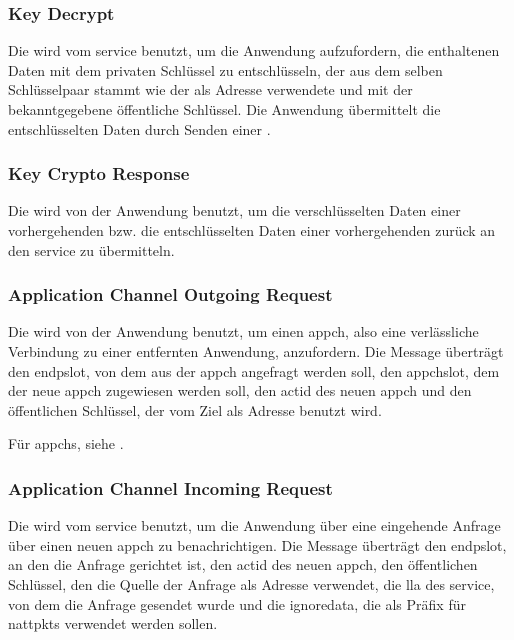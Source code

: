\asprotokeyencbytefield


\subsubsection{Key Decrypt}
\label{dcl-asproto-keydec}
Die \msg{\asprotokeyenc} wird vom \gls{service} benutzt, um die Anwendung
aufzufordern, die enthaltenen Daten mit dem privaten Schlüssel zu entschlüsseln,
der aus dem selben Schlüsselpaar stammt wie der als Adresse verwendete und mit
der \msg{\asprotoaddrpubkey} bekanntgegebene öffentliche Schlüssel.
Die Anwendung übermittelt die entschlüsselten Daten durch Senden einer
\msg{\asprotocryptoresponse}.

\asprotokeydecbytefield


\subsubsection{Key Crypto Response}
\label{dcl-asproto-cryptoresponse}
Die \msg{\asprotocryptoresponse} wird von der Anwendung benutzt, um die
verschlüsselten Daten einer vorhergehenden \msg{\asprotokeyenc} bzw. die
entschlüsselten Daten einer vorhergehenden \msg{\asprotokeydec} zurück an den
\gls{service} zu übermitteln.

\asprotocryptoresponsebytefield


\subsubsection{Application Channel Outgoing Request}
\label{dcl-asproto-appchoutreq}
Die \msg{\asprotoappchoutreq} wird von der Anwendung benutzt, um einen
\gls{appch}, also eine verlässliche Verbindung zu einer entfernten Anwendung,
anzufordern.
Die Message überträgt den \gls{endpslot}, von dem aus der \gls{appch} angefragt
werden soll, den \gls{appchslot}, dem der neue \gls{appch} zugewiesen werden
soll, den \gls{actid} des neuen \gls{appch} und den öffentlichen Schlüssel,
der vom Ziel als Adresse benutzt wird.

Für \glspl{appch}, siehe .

\asprotoappchoutreqbytefield


\subsubsection{Application Channel Incoming Request}
\label{dcl-asproto-appchinreq}
Die \msg{\asprotoappchinreq} wird vom \gls{service} benutzt, um die Anwendung
über eine eingehende Anfrage über einen neuen \gls{appch} zu benachrichtigen.
Die Message überträgt den \gls{endpslot}, an den die Anfrage gerichtet ist,
den \gls{actid} des neuen \gls{appch}, den öffentlichen Schlüssel, den die
Quelle der Anfrage als Adresse verwendet, die \gls{lla} des \gls{service}, von
dem die Anfrage gesendet wurde und die \gls{ignoredata}, die als Präfix für
\glspl{nattpkt} verwendet werden sollen.

